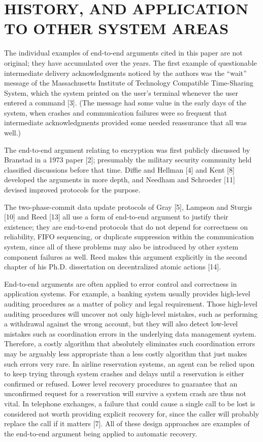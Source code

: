 \documentclass[a4paper,11pt,notitlepage,twoside,openright]{article}
\begin{document}
\hypertarget{history-and-application-to-other-system-areas}{%
\section{HISTORY, AND APPLICATION TO OTHER SYSTEM
AREAS}\label{history-and-application-to-other-system-areas}}


The individual examples of end-to-end arguments cited in this paper are
not original; they have accumulated over the years. The first example of
questionable intermediate delivery acknowledgments noticed by the
authors was the ``wait'' message of the Massachusetts Institute of
Technology Compatible Time-Sharing System, which the system printed on
the user's terminal whenever the user entered a command {[}3{]}. (The
message had some value in the early days of the system, when crashes and
communication failures were so frequent that intermediate
acknowledgments provided some needed reassurance that all was well.)


The end-to-end argument relating to encryption was first publicly
discussed by Branstad in a 1973 paper {[}2{]}; presumably the military
security community held classified discussions before that time. Diffie
and Hellman {[}4{]} and Kent {[}8{]} developed the arguments in more
depth, and Needham and Schroeder {[}11{]} devised improved protocols for
the purpose.


The two-phase-commit data update protocols of Gray {[}5{]}, Lampson and
Sturgis {[}10{]} and Reed {[}13{]} all use a form of end-to-end argument to justify
their existence; they are end-to-end protocols that do not depend for
correctness on reliability, FIFO sequencing, or duplicate suppression
within the communication system, since all of these problems may also
be introduced by other system component failures as well. Reed makes
this argument explicitly in the second chapter of his Ph.D.
dissertation on decentralized atomic actions {[}14{]}.

End-to-end arguments are often applied to error control and correctness
in application systems. For example, a banking system usually provides
high-level auditing procedures as a matter of policy and legal
requirement. Those high-level auditing procedures will uncover not only
high-level mistakes, such as performing a withdrawal against the wrong
account, but they will also detect low-level mistakes such as
coordination errors in the underlying data management system. Therefore,
a costly algorithm that absolutely eliminates such coordination errors
may be arguably less appropriate than a less costly algorithm that just
makes such errors very rare. In airline reservation systems, an agent
can be relied upon to keep trying through system crashes and delays
until a reservation is either confirmed or refused. Lower level recovery
procedures to guarantee that an unconfirmed request for a reservation
will survive a system crash are thus not vital. In telephone exchanges,
a failure that could cause a single call to be lost is considered not
worth providing explicit recovery for, since the caller will probably
replace the call if it matters {[}7{]}. All of these design approaches
are examples of the end-to-end argument being applied to automatic
recovery.
\end{document}
